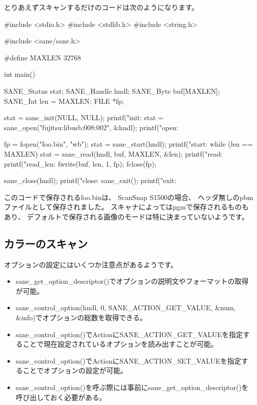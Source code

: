 \documentclass[mingoth,a4paper]{jsarticle}
\begin{document}
とりあえずスキャンするだけのコードは次のようになります。

\begin{commandline}
#include <stdio.h>
#include <stdlib.h>
#include <string.h>

#include <sane/sane.h>


#define MAXLEN 32768

int main()
{
  SANE_Status stat;
  SANE_Handle hndl;
  SANE_Byte buf[MAXLEN];
  SANE_Int len = MAXLEN;
  FILE *fp;

  stat = sane_init(NULL, NULL);
  printf("init: %
  stat = sane_open("fujitsu:libusb:008:002", &hndl);
  printf("open: %

  fp = fopen("foo.bin", "wb");
  stat = sane_start(hndl);
  printf("start: %
  while (len == MAXLEN) {
    stat = sane_read(hndl, buf, MAXLEN, &len);
    printf("read: %
    printf("read_len: %
    fwrite(buf, len, 1, fp);
  }
  fclose(fp);

  sane_close(hndl);
  printf("close: %
  sane_exit();
  printf("exit: %
}
\end{commandline}

このコードで保存されるfoo.binは、
ScanSnap S1500の場合、
ヘッダ無しのpbmファイルとして保存されました。
スキャナによってはpgmで保存されるものもあり、
デフォルトで保存される画像のモードは特に決まっていないようです。


\subsection{カラーのスキャン}

オプションの設定にはいくつか注意点があるようです。

\begin{itemize}
\item sane\_get\_option\_descriptor()でオプションの説明文やフォーマットの取得が可能。
\item sane\_control\_option(hndl, 0, SANE\_ACTION\_GET\_VALUE, \&num, \&info)でオプションの総数を取得できる。
\item sane\_control\_option()でActionにSANE\_ACTION\_GET\_VALUEを指定することで現在設定されているオプションを読み出すことが可能。
\item sane\_control\_option()でActionにSANE\_ACTION\_SET\_VALUEを指定することでオプションの設定が可能。
\item sane\_control\_option()を呼ぶ際には事前にsane\_get\_option\_descriptor()を呼び出しておく必要がある。
\end{itemize}
\end{document}
